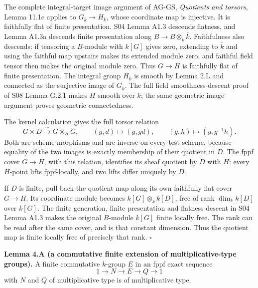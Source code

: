 \documentclass[11pt,a4paper,openany]{report}
\begin{document}
The complete integral-target image argument of AG-GS, \emph{Quotients and torsors}, Lemma 11.1c applies to \(G_{\bar k}\to H_{\bar k}\), whose coordinate map is injective. It is faithfully flat of finite presentation. S04 Lemma A1.3 descends flatness, and Lemma A1.3a descends finite presentation along \(B\to B\otimes_k\bar k\). Faithfulness also descends: if tensoring a \(B\)-module with \(k[G]\) gives zero, extending to \(\bar k\) and using the faithful map upstairs makes its extended module zero, and faithful field tensor then makes the original module zero. Thus \(G\to H\) is faithfully flat of finite presentation. The integral group \(H_{\bar k}\) is smooth by Lemma 2.L and connected as the surjective image of \(G_{\bar k}\). The full field smoothness-descent proof of S08 Lemma G.2.1 makes \(H\) smooth over \(k\); the same geometric image argument proves geometric connectedness.

The kernel calculation gives the full torsor relation \[
 G\times D\xrightarrow{\sim}G\times_H G,
 \qquad(g,d)\longmapsto(g,gd),
 \qquad(g,h)\longmapsto(g,g^{-1}h).
\] Both are scheme morphisms and are inverse on every test scheme, because equality of the two images is exactly membership of their quotient in \(D\). The fppf cover \(G\to H\), with this relation, identifies its sheaf quotient by \(D\) with \(H\): every \(H\)-point lifts fppf-locally, and two lifts differ uniquely by \(D\).

If \(D\) is finite, pull back the quotient map along its own faithfully flat cover \(G\to H\). Its coordinate module becomes \(k[G]\otimes_k k[D]\), free of rank \(\dim_k k[D]\) over \(k[G]\). The finite generation, finite presentation and flatness descent in S04 Lemma A1.3 makes the original \(B\)-module \(k[G]\) finite locally free. The rank can be read after the same cover, and is that constant dimension. Thus the quotient map is finite locally free of precisely that rank. \(\square\)

\textbf{Lemma 4.A (a commutative finite extension of multiplicative-type groups).} A finite commutative \(k\)-group \(E\) in an fppf exact sequence \[
 1\longrightarrow N\longrightarrow E\longrightarrow Q\longrightarrow1
\] with \(N\) and \(Q\) of multiplicative type is of multiplicative type.
\end{document}

